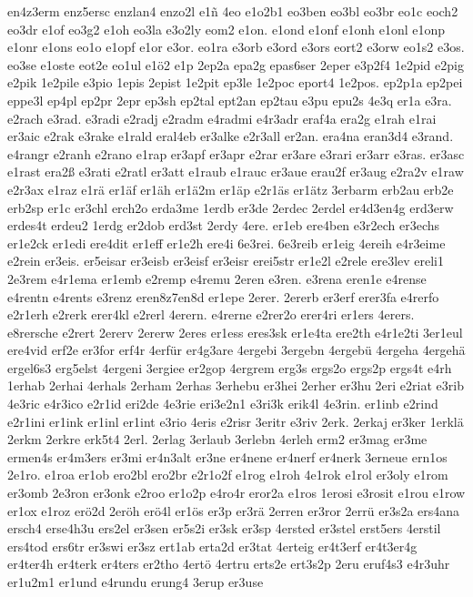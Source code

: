 {en4z3erm
enz5ersc
enzlan4
enzo2l
e1ñ
4eo
e1o2b1
eo3ben
eo3bl
eo3br
eo1c
eoch2
eo3dr
e1of
eo3g2
e1oh
eo3la
e3o2ly
eom2
e1on.
e1ond
e1onf
e1onh
e1onl
e1onp
e1onr
e1ons
eo1o
e1opf
e1or
e3or.
eo1ra
e3orb
e3ord
e3ors
eort2
e3orw
eo1s2
e3os.
eo3se
e1oste
eot2e
eo1ul
e1ö2
e1p
2ep2a
epa2g
epas6ser
2eper
e3p2f4
1e2pid
e2pig
e2pik
1e2pile
e3pio
1epis
2epist
1e2pit
ep3le
1e2poc
eport4
1e2pos.
ep2p1a
ep2pei
eppe3l
ep4pl
ep2pr
2epr
ep3sh
ep2tal
ept2an
ep2tau
e3pu
epu2s
4e3q
er1a
e3ra.
e2rach
e3rad.
e3radi
e2radj
e2radm
e4radmi
e4r3adr
eraf4a
era2g
e1rah
e1rai
er3aic
e2rak
e3rake
e1rald
eral4eb
er3alke
e2r3all
er2an.
era4na
eran3d4
e3rand.
e4rangr
e2ranh
e2rano
e1rap
er3apf
er3apr
e2rar
er3are
e3rari
er3arr
e3ras.
er3asc
e1rast
era2ß
e3rati
e2ratl
er3att
e1raub
e1rauc
er3aue
erau2f
er3aug
e2ra2v
e1raw
e2r3ax
e1raz
e1rä
er1äf
er1äh
er1ä2m
er1äp
e2r1äs
er1ätz
3erbarm
erb2au
erb2e
erb2sp
er1c
er3chl
erch2o
erda3me
1erdb
er3de
2erdec
2erdel
er4d3en4g
erd3erw
erdes4t
erdeu2
1erdg
er2dob
erd3st
2erdy
4ere.
er1eb
ere4ben
e3r2ech
er3echs
er1e2ck
er1edi
ere4dit
er1eff
er1e2h
ere4i
6e3rei.
6e3reib
er1eig
4ereih
e4r3eime
e2rein
er3eis.
er5eisar
er3eisb
er3eisf
er3eisr
erei5str
er1e2l
e2rele
ere3lev
ereli1
2e3rem
e4r1ema
er1emb
e2remp
e4remu
2eren
e3ren.
e3rena
eren1e
e4rense
e4rentn
e4rents
e3renz
eren8z7en8d
er1epe
2erer.
2ererb
er3erf
erer3fa
e4rerfo
e2r1erh
e2rerk
erer4kl
e2rerl
4erern.
e4rerne
e2rer2o
erer4ri
er1ers
4erers.
e8rersche
e2rert
2ererv
2ererw
2eres
er1ess
eres3sk
er1e4ta
ere2th
e4r1e2ti
3er1eul
ere4vid
erf2e
er3for
erf4r
4erfür
er4g3are
4ergebi
3ergebn
4ergebü
4ergeha
4ergehä
ergel6s3
erg5elst
4ergeni
3ergiee
er2gop
4ergrem
erg3s
ergs2o
ergs2p
ergs4t
e4rh
1erhab
2erhai
4erhals
2erham
2erhas
3erhebu
er3hei
2erher
er3hu
2eri
e2riat
e3rib
4e3ric
e4r3ico
e2r1id
eri2de
4e3rie
eri3e2n1
e3ri3k
erik4l
4e3rin.
er1inb
e2rind
e2r1ini
er1ink
er1inl
er1int
e3rio
4eris
e2risr
3eritr
e3riv
2erk.
2erkaj
er3ker
1erklä
2erkm
2erkre
erk5t4
2erl.
2erlag
3erlaub
3erlebn
4erleh
erm2
er3mag
er3me
ermen4s
er4m3ers
er3mi
er4n3alt
er3ne
er4nene
er4nerf
er4nerk
3erneue
ern1os
2e1ro.
e1roa
er1ob
ero2bl
ero2br
e2r1o2f
e1rog
e1roh
4e1rok
e1rol
er3oly
e1rom
er3omb
2e3ron
er3onk
e2roo
er1o2p
e4ro4r
eror2a
e1ros
1erosi
e3rosit
e1rou
e1row
er1ox
e1roz
erö2d
2eröh
erö4l
er1ös
er3p
er3rä
2erren
er3ror
2errü
er3s2a
ers4ana
ersch4
erse4h3u
ers2el
er3sen
er5s2i
er3sk
er3sp
4ersted
er3stel
erst5ers
4erstil
ers4tod
ers6tr
er3swi
er3sz
ert1ab
erta2d
er3tat
4erteig
er4t3erf
er4t3er4g
er4ter4h
er4terk
er4ters
er2tho
4ertö
4ertru
erts2e
ert3s2p
2eru
eruf4s3
e4r3uhr
er1u2m1
er1und
e4rundu
erung4
3erup
er3use
}

